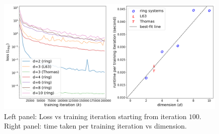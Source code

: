 \begin{figure}[!ht]
    \centering\includegraphics[scale=0.4]{steady-fp/plots/steady-plots-loss-time.png}
    \caption{Left panel: Loss vs training iteration starting from iteration $100$. Right panel: time taken per training iteration vs dimension.}
    \label{fig:time-loss--steady-fp}
\end{figure}
